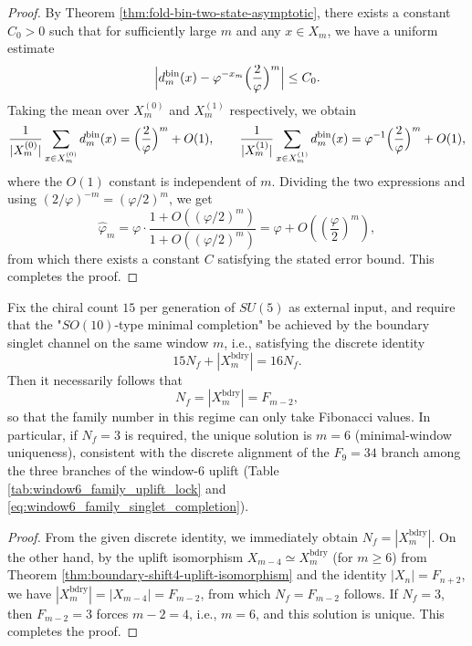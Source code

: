 \begin{proof}
By Theorem \ref{thm:fold-bin-two-state-asymptotic}, there exists a constant \(C_0>0\) such that for sufficiently large \(m\) and any \(x\in X_m\), we have a uniform estimate
\[
\Bigl|d_m^{\mathrm{bin}}(x)-\varphi^{-x_m}\Bigl(\frac{2}{\varphi}\Bigr)^m\Bigr|\le C_0.
\]
Taking the mean over \(X_m^{(0)}\) and \(X_m^{(1)}\) respectively, we obtain
\[
\frac{1}{|X_m^{(0)}|}\sum_{x\in X_m^{(0)}} d_m^{\mathrm{bin}}(x)
=\Bigl(\frac{2}{\varphi}\Bigr)^m+O(1),
\qquad
\frac{1}{|X_m^{(1)}|}\sum_{x\in X_m^{(1)}} d_m^{\mathrm{bin}}(x)
=\varphi^{-1}\Bigl(\frac{2}{\varphi}\Bigr)^m+O(1),
\]
where the \(O(1)\) constant is independent of \(m\).
Dividing the two expressions and using \((2/\varphi)^{-m}=(\varphi/2)^m\), we get
\[
\widehat\varphi_m=\varphi\cdot\frac{1+O((\varphi/2)^m)}{1+O((\varphi/2)^m)}
=\varphi+O\!\left(\left(\frac{\varphi}{2}\right)^m\right),
\]
from which there exists a constant \(C\) satisfying the stated error bound. This completes the proof.
\end{proof}

\begin{theorem}[Window Quantization and Minimal-Window Uniqueness of Family Number: \texorpdfstring{$N_f=|X_m^{\mathrm{bdry}}|$}{Nf=|Xbdry|}]\label{thm:xi-family-number-window-quantization-minimal-window}
Fix the chiral count \(15\) per generation of \(SU(5)\) as external input, and require that the "\(SO(10)\)-type minimal completion" be achieved by the boundary singlet channel on the same window \(m\), i.e., satisfying the discrete identity
\[
15N_f+|X_m^{\mathrm{bdry}}|=16N_f.
\]
Then it necessarily follows that
\[
N_f=|X_m^{\mathrm{bdry}}|=F_{m-2},
\]
so that the family number in this regime can only take Fibonacci values.
In particular, if \(N_f=3\) is required, the unique solution is \(m=6\) (minimal-window uniqueness), consistent with the discrete alignment of the \(F_9=34\) branch among the three branches of the window-\(6\) uplift (Table \ref{tab:window6_family_uplift_lock} and \eqref{eq:window6_family_singlet_completion}).
\end{theorem}

\begin{proof}
From the given discrete identity, we immediately obtain \(N_f=|X_m^{\mathrm{bdry}}|\).
On the other hand, by the uplift isomorphism \(X_{m-4}\simeq X_m^{\mathrm{bdry}}\) (for \(m\ge 6\)) from Theorem \ref{thm:boundary-shift4-uplift-isomorphism} and the identity \(|X_n|=F_{n+2}\), we have
\(|X_m^{\mathrm{bdry}}|=|X_{m-4}|=F_{m-2}\), from which \(N_f=F_{m-2}\) follows.
If \(N_f=3\), then \(F_{m-2}=3\) forces \(m-2=4\), i.e., \(m=6\), and this solution is unique. This completes the proof.
\end{proof}

